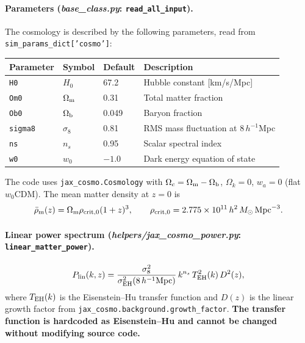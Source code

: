 \documentclass[12pt,a4paper]{article}
\newcommand{\code}[1]{\texttt{\small #1}}
\newcommand{\param}[1]{\texttt{\small #1}}
\newcommand{\file}[1]{\textit{\small #1}}
\begin{document}
\paragraph{Parameters (\file{base\_class.py}: \code{read\_all\_input}).}
The cosmology is described by the following parameters, read from
\param{sim\_params\_dict['cosmo']}:

\begin{center}
\begin{tabular}{llll}
\toprule
Parameter & Symbol & Default & Description \\
\midrule
\param{H0} & $H_0$ & 67.2 & Hubble constant [km/s/Mpc] \\
\param{Om0} & $\Omega_{\rm m}$ & 0.31 & Total matter fraction \\
\param{Ob0} & $\Omega_{\rm b}$ & 0.049 & Baryon fraction \\
\param{sigma8} & $\sigma_8$ & 0.81 & RMS mass fluctuation at $8\,h^{-1}$Mpc \\
\param{ns} & $n_s$ & 0.95 & Scalar spectral index \\
\param{w0} & $w_0$ & $-1.0$ & Dark energy equation of state \\
\bottomrule
\end{tabular}
\end{center}

The code uses \code{jax\_cosmo.Cosmology} with
$\Omega_c = \Omega_{\rm m} - \Omega_{\rm b}$, $\Omega_k=0$, $w_a=0$ (flat
$w_0$CDM). The mean matter density at $z=0$ is
\begin{equation}
  \bar\rho_{\rm m}(z) = \Omega_{\rm m}\rho_{\rm crit,0}(1+z)^3,
  \qquad \rho_{\rm crit,0} = 2.775\times10^{11}\,h^2\,M_\odot\,{\rm Mpc}^{-3}.
\end{equation}

\paragraph{Linear power spectrum (\file{helpers/jax\_cosmo\_power.py}: \code{linear\_matter\_power}).}
\begin{equation}
  P_{\rm lin}(k,z) = \frac{\sigma_8^2}{\sigma^2_{\rm EH}(8\,h^{-1}{\rm Mpc})}
  \,k^{n_s}\,T^2_{\rm EH}(k)\,D^2(z),
\end{equation}
where $T_{\rm EH}(k)$ is the Eisenstein--Hu transfer function
\citep{EisensteinHu1998} and $D(z)$ is the linear growth factor from
\code{jax\_cosmo.background.growth\_factor}.
\textbf{The transfer function is hardcoded as Eisenstein--Hu and cannot be changed
without modifying source code.}
\end{document}
